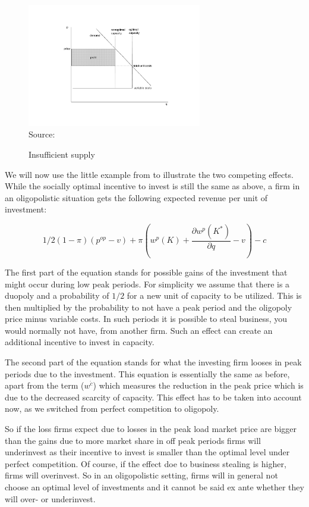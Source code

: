 \begin{figure}[h]
\centering
\caption{Insufficient supply}
\includegraphics[width=3.0in]{capacity/imperfect_spot_pricing2}
      \label{peak_load_insufficient}  
\\          
\scriptsize Source: \cite{Fehr1995}
\end{figure}

We will now use the little example from \cite{Fehr1995} to illustrate the two competing effects.
While the socially optimal incentive to invest is still the same as above, a firm in an oligopolistic situation gets the following expected revenue per unit of investment:

\begin{equation}
	1/2 (1-\pi) (p^{op}-v) + \pi (w^p(K)+\frac{\partial w^p(K^*)}{\partial q}-v) - c
\end{equation}

The first part of the equation stands for possible gains of the investment that might occur during low peak periods. For simplicity we assume that there is a duopoly and a probability of $1/2$ for a new unit of capacity to be utilized. This is then multiplied by the probability to not have a peak period and the oligopoly price minus variable costs. In such periods it is possible to steal business, you would normally not have, from another firm. Such an effect can create an additional incentive to invest in capacity. %

The second part of the equation stands for what the investing firm looses in peak periods due to the investment. This equation is essentially the same as before, apart from the term ($w^{\acute{c}}$) which measures the reduction in the peak price which is due to the decreased scarcity of capacity. This effect has to be taken into account now, as we switched from perfect competition to oligopoly.

So if the loss firms expect due to losses in the peak load market price are bigger than the gains due to more market share in off peak periods firms will underinvest as their incentive to invest is smaller than the optimal level under perfect competition. Of course, if the effect doe to business stealing is higher, firms will overinvest. So in an oligopolistic setting, firms will in general not choose an optimal level of investments and it cannot be said ex ante whether they will over- or underinvest.





